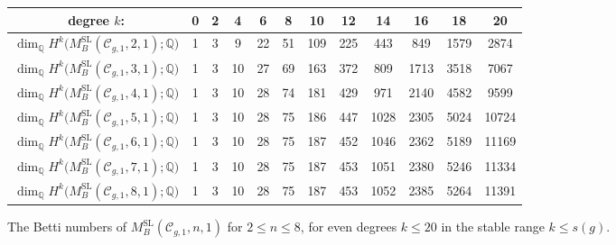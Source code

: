 \documentclass[11pt,reqno]{amsart}
\theoremstyle{plain} %
\theoremstyle{definition}
\newcommand{\QQ}{\mathbb{Q}}
\newcommand{\C}{\mathcal{C}}
\DeclareMathOperator{\SL}{SL}
\begin{document}
\begin{figure}[ht!]
\renewcommand{\arraystretch}{1.35}
\setlength{\tabcolsep}{4.5pt}
	\begin{tabular}{|c|c|c|c|c|c|c|c|c|c|c|c|}
		\hline
		degree $k$: & 0 & 2 & 4 & 6 & 8 & 10 & 12 & 14 & 16 & 18 & 20 \\
		\hline
		$\dim_\QQ H^{k}\big(M_B^{\SL}(\C_{g,1},2,1); \QQ\big)$ & 1 & 3 & 9 & 22 & 51 & 109 & 225 & 443 & 849 & 1579 & 2874 \\
		$\dim_\QQ H^{k}\big(M_B^{\SL}(\C_{g,1},3,1); \QQ\big)$ & 1 & 3 & 10 & 27 & 69 & 163 & 372 & 809 & 1713 & 3518 & 7067 \\
		$\dim_\QQ H^{k}\big(M_B^{\SL}(\C_{g,1},4,1); \QQ\big)$ & 1 & 3 & 10 & 28 & 74 & 181 & 429 & 971 & 2140 & 4582 & 9599 \\
		$\dim_\QQ H^{k}\big(M_B^{\SL}(\C_{g,1},5,1); \QQ\big)$ & 1 & 3 & 10 & 28 & 75 & 186 & 447 & 1028 & 2305 & 5024 & 10724 \\
		$\dim_\QQ H^{k}\big(M_B^{\SL}(\C_{g,1},6,1); \QQ\big)$ & 1 & 3 & 10 & 28 & 75 & 187 & 452 & 1046 & 2362 & 5189 & 11169 \\
		$\dim_\QQ H^{k}\big(M_B^{\SL}(\C_{g,1},7,1); \QQ\big)$ & 1 & 3 & 10 & 28 & 75 & 187 & 453 & 1051 & 2380 & 5246 & 11334 \\
		$\dim_\QQ H^{k}\big(M_B^{\SL}(\C_{g,1},8,1); \QQ\big)$ & 1 & 3 & 10 & 28 & 75 & 187 & 453 & 1052 & 2385 & 5264 & 11391 \\
		\hline
	\end{tabular}
	\caption{The Betti numbers of $M_B^{\SL}(\C_{g,1},n,1)$ for $2 \leq n \leq 8$, for even degrees $k \leq 20$ in the stable range $k \leq s(g)$.}
	\label{fig:table-sl}
\end{figure}
\end{document}
